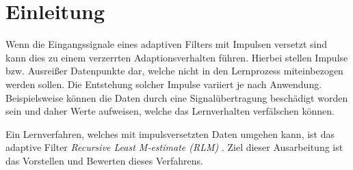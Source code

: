 \documentclass[a4paper, 12pt]{article}
\begin{document}


\tableofcontents
\newpage
{}





\section{Einleitung}
\label{sec:einleitung}
Wenn die Eingangssignale eines adaptiven Filters mit Impulsen versetzt sind kann dies zu einem verzerrten Adaptionsverhalten führen. Hierbei stellen Impulse bzw. Ausreißer Datenpunkte dar, welche nicht in den Lernprozess miteinbezogen werden sollen. Die Entstehung solcher Impulse variiert je nach Anwendung. Beispielsweise können die Daten durch eine Signalübertragung beschädigt worden sein und daher Werte aufweisen, welche das Lernverhalten verfälschen können.

Ein Lernverfahren, welches mit impulsversetzten Daten umgehen kann, ist das adaptive Filter \emph{Recursive Least M-estimate (RLM)} \cite{zou2000recursive}. Ziel dieser Ausarbeitung ist das Vorstellen und Bewerten dieses Verfahrens.
\end{document}
